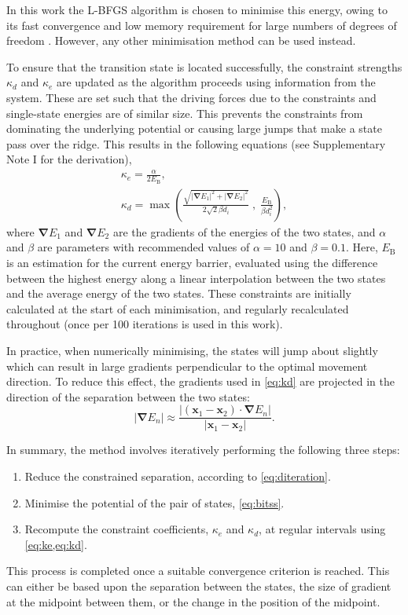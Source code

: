 \documentclass[aip,jcp,reprint,twocolumn]{revtex4-1}
\newcommand{\abs}[1]{\left| #1 \right|}
\newcommand{\grad}{\bm{\nabla}}
\begin{document}
In this work the L-BFGS algorithm is chosen to minimise this energy, owing to its fast convergence and low memory requirement for large numbers of degrees of freedom \cite{Liu1989}.
However, any other minimisation method can be used instead.

To ensure that the transition state is located successfully, the constraint strengths $\kappa_d$ and $\kappa_e$ are updated as the algorithm proceeds using information from the system.
These are set such that the driving forces due to the constraints and single-state energies are of similar size.
This prevents the constraints from dominating the underlying potential or causing large jumps that make a state pass over the ridge.
This results in the following equations (see Supplementary Note I for the derivation),
\begin{gather}
  \kappa_e = \frac {\alpha} {2 E_\mathrm{B}},
  \label{eq:ke}
  \\
  \kappa_d = \max \left(
    \frac {\sqrt{\abs{\grad E_1}^2 + \abs{\grad E_2}^2}} {2\sqrt{2} \beta d_i} \; , \;
    \frac{E_\mathrm{B}}{\beta d_i^2} \right),
  \label{eq:kd}
\end{gather}
where $\grad E_1$ and $\grad E_2$ are the gradients of the energies of the two states, and $\alpha$ and $\beta$ are parameters with recommended values of $\alpha = 10$ and $\beta = 0.1$.
Here, $E_\mathrm{B}$ is an estimation for the current energy barrier, evaluated using the difference between the highest energy along a linear interpolation between the two states and the average energy of the two states.
These constraints are initially calculated at the start of each minimisation, and regularly recalculated throughout (once per 100 iterations is used in this work).

In practice, when numerically minimising, the states will jump about slightly which can result in large gradients perpendicular to the optimal movement direction.
To reduce this effect, the gradients used in \cref{eq:kd} are projected in the direction of the separation between the two states:
\begin{equation}
  \abs{\grad E_n} \approx \frac {\abs{(\bm{x}_1 - \bm{x}_2) \cdot \grad E_n}} {\abs{\bm{x}_1 - \bm{x}_2}}.
\end{equation}

In summary, the method involves iteratively performing the following three steps:
\begin{enumerate}
  \item Reduce the constrained separation, according to \cref{eq:diteration}.
  \item Minimise the potential of the pair of states, \cref{eq:bitss}.
  \item Recompute the constraint coefficients, $\kappa_e$ and $\kappa_d$, at regular intervals using \cref{eq:ke,eq:kd}.
\end{enumerate}
This process is completed once a suitable convergence criterion is reached.
This can either be based upon the separation between the states, the size of gradient at the midpoint between them, or the change in the position of the midpoint.
\end{document}
